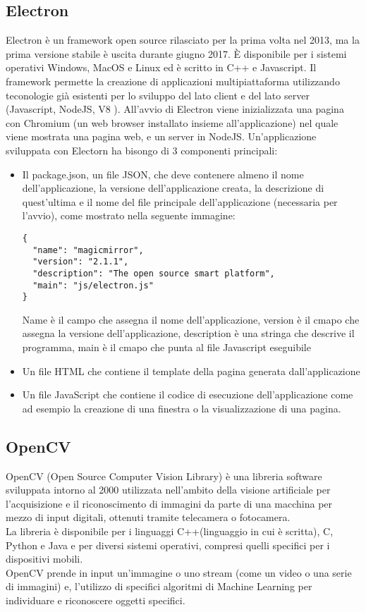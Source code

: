 \subsection{Electron}\label{cap:Electron}
Electron \`e un framework open source rilasciato per la prima volta nel 2013, ma la prima versione
stabile \`e uscita durante giugno 2017. \`E disponibile per i sistemi operativi Windows, MacOS e Linux ed \`e scritto
in C++ e Javascript. Il framework permette la creazione di applicazioni multipiattaforma
utilizzando teconologie gi\`a esistenti per lo sviluppo
del lato client e del lato server (Javascript, NodeJS, V8 \cite{V8}).
All'avvio di Electron viene inizializzata una pagina con Chromium \cite{Chromium}(un web browser installato insieme all'applicazione)
nel quale viene mostrata una pagina web, e un server in NodeJS.
Un'applicazione sviluppata con Electorn ha bisongo di 3 componenti principali:
\begin{itemize}
\item Il package.json, un file JSON, che deve contenere almeno il nome dell'applicazione,
la versione dell'applicazione creata, la descrizione di quest'ultima e il
 nome del file principale dell'applicazione (necessaria per l'avvio), come mostrato nella
 seguente immagine:
\begin{lstlisting}
{
  "name": "magicmirror",
  "version": "2.1.1",
  "description": "The open source smart platform",
  "main": "js/electron.js"
}
\end{lstlisting}
Name è il campo che assegna il nome dell'applicazione, version è il cmapo che assegna la versione
dell'applicazione, description è una stringa che descrive il programma, main è il cmapo che punta al file
Javascript eseguibile
\item Un file HTML che contiene il template della pagina generata dall'applicazione
\item Un file JavaScript che contiene il codice di esecuzione dell'applicazione come ad esempio la
creazione di una finestra o la visualizzazione di una pagina.
\end{itemize}

\subsection{OpenCV}
OpenCV (Open Source Computer Vision Library) \`e una libreria software sviluppata intorno al 2000
utilizzata nell'ambito della visione artificiale per l'acquisizione e il riconoscimento di immagini
da parte di una macchina per mezzo di input digitali, ottenuti tramite telecamera o fotocamera.\\
La libreria \`e disponibile per i linguaggi C++(linguaggio in cui \`e scritta), C, Python e Java e
per diversi sistemi operativi, compresi quelli specifici per i dispositivi mobili.\\
OpenCV prende in input un'immagine o uno stream (come un video o una serie di immagini) e, l'utilizzo di
specifici algoritmi di Machine Learning per individuare e riconoscere oggetti specifici.

